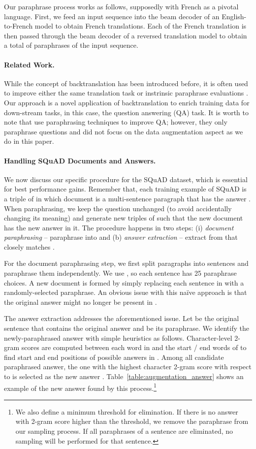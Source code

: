 \documentclass{article} \usepackage{iclr2018_conference,times}
\begin{document}
Our paraphrase process works as follows, supposedly with French as a pivotal language. First, we feed an input sequence into the beam decoder of an English-to-French model to obtain  French translations. Each of the French translation is then passed through the beam decoder of a reversed translation model to obtain a total of  paraphrases of the input sequence. 

\paragraph{Related Work.} While the concept of backtranslation has been introduced before, it is often used to improve either the same translation task \citet{sennrich16} or instrinsic paraphrase evaluations \citet{wieting17,paranet17}. Our approach is a novel application of backtranslation to enrich training data for down-stream tasks, in this case, the question answering (QA) task.  
It is worth to note that \citep{li17} use paraphrasing techniques to improve QA; however, they only paraphrase questions and did not focus on the data augmentation aspect as we do in this paper.

\paragraph{Handling SQuAD Documents and Answers.}
We now discuss our specific procedure for the SQuAD dataset, which is essential for best performance gains. Remember that, each training example of SQuAD is a triple of  in which document  is a multi-sentence paragraph that has the answer . When paraphrasing, we keep the question  unchanged (to avoid accidentally changing its meaning) and generate new triples of  such that the new document  has the new answer  in it. The procedure happens in two steps: (i) {\it document paraphrasing} -- paraphrase  into  and (b) {\it answer extraction} -- extract  from  that closely matches .

For the document paraphrasing step, we first split paragraphs into sentences and paraphrase them independently. We use , so each sentence has 25 paraphrase choices. A new document  is formed by simply replacing each sentence in  with a randomly-selected paraphrase. An obvious issue with this na\"{i}ve approach is that the original answer  might no longer be present in .

The answer extraction addresses the aforementioned issue.
Let  be the original sentence that contains the original answer  and  be its paraphrase. We identify the newly-paraphrased answer with simple heuristics as follows. Character-level 2-gram scores are computed between each word in  and the start / end words of  to find start and end positions of possible answers in .
Among all candidate paraphrased answer, the one with the highest character 2-gram score with respect to  is selected as the new answer . Table~\ref{table:augmentation_answer} shows an example of the new answer found by this process.\footnote{We also define a minimum threshold for elimination. If there is no answer with 2-gram score higher than the threshold, we remove the paraphrase  from our sampling process. If all paraphrases of a sentence are eliminated, no sampling will be performed for that sentence.}
\end{document}
